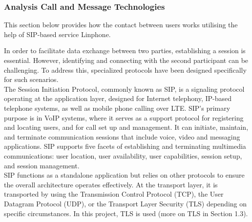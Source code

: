 \subsubsection{Analysis Call and Message Technologies}
\noindent This section below provides how the contact between users works utilising the help of SIP-based service Linphone.

    In order to facilitate data exchange between two parties, 
    establishing a session is essential. However, identifying and connecting with 
    the second participant can be challenging. To address this, specialized protocols 
    have been designed specifically for such scenarios. \\

    \noindent The Session Initiation Protocol, 
    commonly known as SIP, is a signaling protocol operating at the 
    application layer, designed for Internet telephony, IP-based telephone systems, 
    as well as mobile phone calling over LTE. SIP’s primary purpose is in VoIP systems, where it serves 
    as a support protocol for registering and locating users, and for call set up and management. It can initiate, maintain, 
    and terminate communication sessions that include voice, video and messaging applications. SIP supports five facets of establishing and terminating multimedia communications: 
    user location, user availability, user capabilities, session setup, and session management. \\

    \noindent SIP functions as a standalone application but relies on other protocols 
    to ensure the overall architecture operates effectively. At the transport layer, 
    it is transported by using the Transmission Control Protocol (TCP), the User Datagram Protocol (UDP), 
    or the Transport Layer Security (TLS) depending on specific circumstances. In this project, 
    TLS is used (more on TLS in Section 1.3). \\

